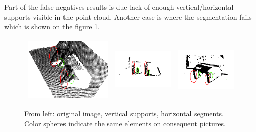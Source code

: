 \documentclass[fontsize=12pt]{article}
\begin{document}
Part of the false negatives results is due lack of enough vertical/horizontal supports visible in the point cloud. Another case is where the segmentation fails which is shown on the figure \ref{fig:fail}.
\begin{figure}
  \begin{center}
    \begin{tabular}{|c|c|c|}
    \hline
      \includegraphics[scale=0.3]{images/fail} & \includegraphics[scale=0.3]{images/failVer} & \includegraphics[scale=0.3]{images/failHor} \\
    \hline
    \end{tabular}
    \caption{From left: original image, vertical supports, horizontal segments. Color spheres indicate the same elements on consequent pictures.}
    \label{fig:fail}
  \end{center}
\end{figure}
\end{document}
